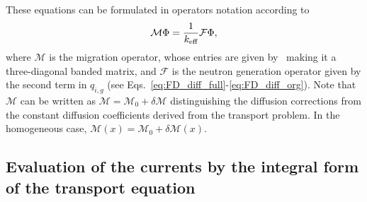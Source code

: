 These equations can be formulated in operators notation according to
\begin{equation}\label{eq:op-not}
\mathcal{M}\Phi=\frac{1}{{k_{\textrm{\scriptsize{eff}}}}}\mathcal{F}\Phi ,
\end{equation}
where $\mathcal{M}$ is the migration operator, whose entries are given by~ making it a three-diagonal banded matrix, and $\mathcal{F}$ is the neutron generation operator given by the second term in $q_{i,g}$ (see Eqs.~\ref{eq:FD_diff_full}-\ref{eq:FD_diff_org}). Note that $\mathcal{M}$ can be written as $\mathcal{M}=\mathcal{M}_0+\delta\mathcal{M}$ distinguishing the diffusion corrections from the constant diffusion coefficients derived from the transport problem. In the homogeneous case, $\mathcal{M}(x)=\mathcal{M}_0+\delta\mathcal{M}(x)$.
%
%
\subsection{Evaluation of the currents by the integral form of the transport equation}
\label{sec:calc-int-curr}

